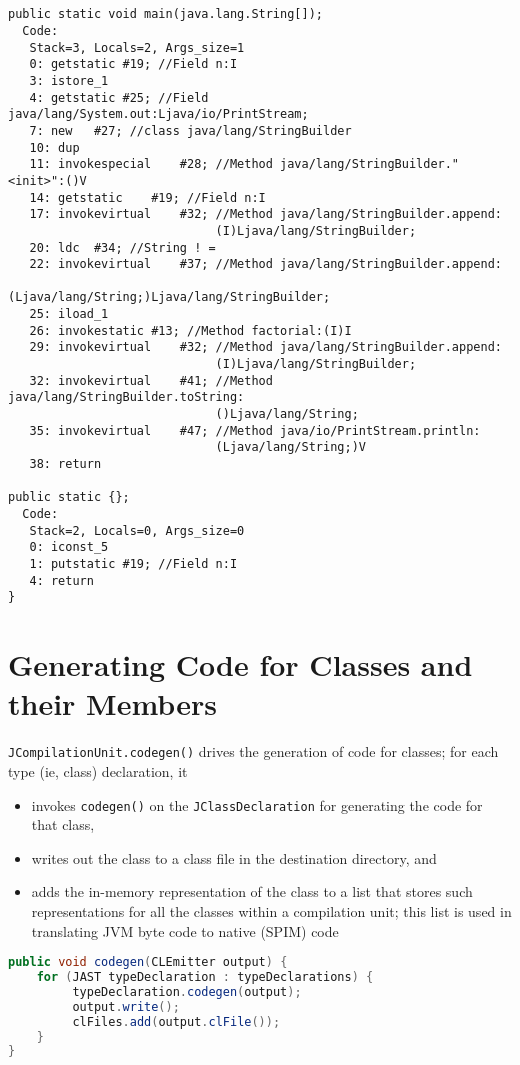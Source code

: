 \documentclass[8pt,a4paper,compress]{beamer}
\begin{document}
\begin{frame}[fragile]
\pause

\begin{lstlisting}[language={},style=focusin]


public static void main(java.lang.String[]);
  Code:
   Stack=3, Locals=2, Args_size=1
   0: getstatic #19; //Field n:I
   3: istore_1
   4: getstatic #25; //Field java/lang/System.out:Ljava/io/PrintStream;
   7: new   #27; //class java/lang/StringBuilder
   10: dup
   11: invokespecial    #28; //Method java/lang/StringBuilder."<init>":()V
   14: getstatic    #19; //Field n:I
   17: invokevirtual    #32; //Method java/lang/StringBuilder.append:
                             (I)Ljava/lang/StringBuilder;
   20: ldc  #34; //String ! =
   22: invokevirtual    #37; //Method java/lang/StringBuilder.append:
                             (Ljava/lang/String;)Ljava/lang/StringBuilder;
   25: iload_1
   26: invokestatic #13; //Method factorial:(I)I
   29: invokevirtual    #32; //Method java/lang/StringBuilder.append:
                             (I)Ljava/lang/StringBuilder;
   32: invokevirtual    #41; //Method java/lang/StringBuilder.toString:
                             ()Ljava/lang/String;
   35: invokevirtual    #47; //Method java/io/PrintStream.println:
                             (Ljava/lang/String;)V
   38: return

public static {};
  Code:
   Stack=2, Locals=0, Args_size=0
   0: iconst_5
   1: putstatic #19; //Field n:I
   4: return
}
\end{lstlisting}
\end{frame}

\section{Generating Code for Classes and their Members}
\begin{frame}[fragile]
\pause

\lstinline{JCompilationUnit.codegen()} drives the generation of code for classes; for each type (ie, class) declaration, it
\begin{itemize}
\pause
\item invokes \lstinline{codegen()} on the \lstinline{JClassDeclaration} for generating the code for that class,
\pause
\item writes out the class to a class file in the destination directory, and
\pause
\item adds the in-memory representation of the class to a list that stores such representations for all the classes within a compilation unit; this list is used in translating JVM byte code to native (SPIM) code
\end{itemize}

\begin{lstlisting}[language=Java,style=focusin]
public void codegen(CLEmitter output) {
    for (JAST typeDeclaration : typeDeclarations) {
         typeDeclaration.codegen(output);
         output.write();
         clFiles.add(output.clFile());
    }
}
\end{lstlisting}
\end{frame}
\end{document}
